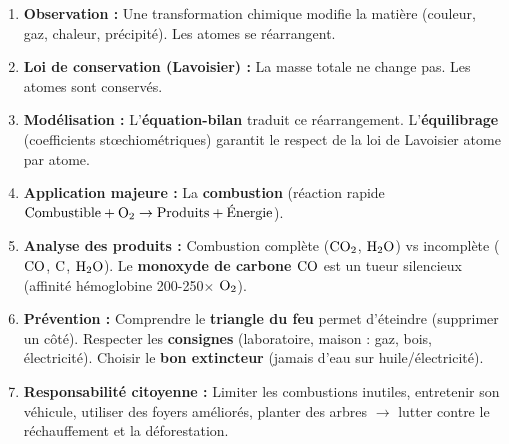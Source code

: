 \documentclass[11pt]{article}
\begin{document}
\begin{enumerate}
    \item \textbf{Observation :} Une transformation chimique modifie la matière (couleur, gaz, chaleur, précipité). Les atomes se réarrangent.
    \item \textbf{Loi de conservation (Lavoisier) :} La masse totale ne change pas. Les atomes sont conservés.
    \item \textbf{Modélisation :} L'\textbf{équation-bilan} traduit ce réarrangement. L'\textbf{équilibrage} (coefficients stœchiométriques) garantit le respect de la loi de Lavoisier atome par atome.
    \item \textbf{Application majeure :} La \textbf{combustion} (réaction rapide $\text{Combustible} + \ce{O2} \rightarrow \text{Produits} + \text{Énergie}$).
    \item \textbf{Analyse des produits :} Combustion complète ($\ce{CO2}$, $\ce{H2O}$) vs incomplète ($\ce{CO}$, $\ce{C}$, $\ce{H2O}$). Le \textbf{monoxyde de carbone $\ce{CO}$} est un tueur silencieux (affinité hémoglobine 200-250$\times$ $\ce{O2}$).
    \item \textbf{Prévention :} Comprendre le \textbf{triangle du feu} permet d'éteindre (supprimer un côté). Respecter les \textbf{consignes} (laboratoire, maison : gaz, bois, électricité). Choisir le \textbf{bon extincteur} (jamais d'eau sur huile/électricité).
    \item \textbf{Responsabilité citoyenne :} Limiter les combustions inutiles, entretenir son véhicule, utiliser des foyers améliorés, planter des arbres $\to$ lutter contre le réchauffement et la déforestation.
\end{enumerate}
\end{document}
